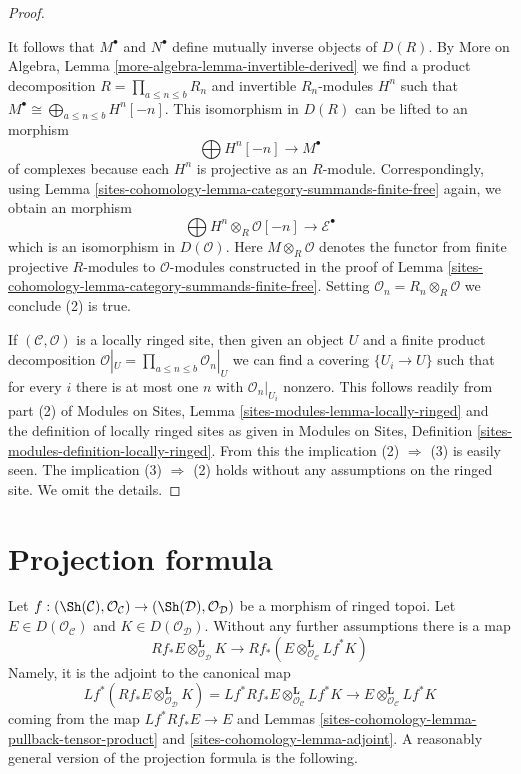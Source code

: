 \begin{proof}
\begin{enumerate}
\end{enumerate}
It follows that $M^\bullet$ and $N^\bullet$ define
mutually inverse objects of $D(R)$. By
More on Algebra, Lemma \ref{more-algebra-lemma-invertible-derived}
we find a product decomposition $R = \prod_{a \leq n \leq b} R_n$
and invertible $R_n$-modules $H^n$ such
that $M^\bullet \cong \bigoplus_{a \leq n \leq b} H^n[-n]$.
This isomorphism in $D(R)$ can be lifted to an morphism
$$
\bigoplus H^n[-n] \longrightarrow M^\bullet
$$
of complexes because each $H^n$ is projective as an $R$-module.
Correspondingly, using Lemma \ref{sites-cohomology-lemma-category-summands-finite-free} again,
we obtain an morphism
$$
\bigoplus H^n \otimes_R \mathcal{O}[-n] \to \mathcal{E}^\bullet
$$
which is an isomorphism in $D(\mathcal{O})$. Here $M \otimes_R \mathcal{O}$
denotes the functor from finite projective $R$-modules to $\mathcal{O}$-modules
constructed in the proof of Lemma \ref{sites-cohomology-lemma-category-summands-finite-free}.
Setting $\mathcal{O}_n = R_n \otimes_R \mathcal{O}$ we conclude
(2) is true.

\medskip\noindent
If $(\mathcal{C}, \mathcal{O})$ is a locally ringed site,
then given an object $U$ and a finite product decomposition
$\mathcal{O}|_U = \prod_{a \leq n \leq b} \mathcal{O}_n|_U$
we can find a covering $\{U_i \to U\}$ such that for every
$i$ there is at most one $n$ with $\mathcal{O}_n|_{U_i}$ nonzero.
This follows readily from part (2) of
Modules on Sites, Lemma \ref{sites-modules-lemma-locally-ringed}
and the definition of locally ringed sites as given in
Modules on Sites, Definition \ref{sites-modules-definition-locally-ringed}.
From this the implication (2) $\Rightarrow$ (3) is easily seen.
The implication (3) $\Rightarrow$ (2) holds without any assumptions
on the ringed site. We omit the details.
\end{proof}

\section{Projection formula}
\label{sites-cohomology-section-projection-formula}
Let $f : (\Sh(\mathcal{C}), \mathcal{O}_\mathcal{C}) \to
(\Sh(\mathcal{D}), \mathcal{O}_\mathcal{D})$ be a morphism of ringed topoi.
Let $E \in D(\mathcal{O}_\mathcal{C})$ and $K \in D(\mathcal{O}_\mathcal{D})$.
Without any further assumptions there is a map
\begin{equation}
\label{equation-projection-formula-map}
Rf_*E \otimes^\mathbf{L}_{\mathcal{O}_\mathcal{D}} K
\longrightarrow
Rf_*(E \otimes^\mathbf{L}_{\mathcal{O}_\mathcal{C}} Lf^*K)
\end{equation}
Namely, it is the adjoint to the canonical map
$$
Lf^*(Rf_*E \otimes^\mathbf{L}_{\mathcal{O}_\mathcal{D}} K) =
Lf^*Rf_*E \otimes^\mathbf{L}_{\mathcal{O}_\mathcal{C}} Lf^*K
\longrightarrow
E \otimes^\mathbf{L}_{\mathcal{O}_\mathcal{C}} Lf^*K
$$
coming from the map $Lf^*Rf_*E \to E$ and Lemmas
\ref{sites-cohomology-lemma-pullback-tensor-product} and \ref{sites-cohomology-lemma-adjoint}.
A reasonably general version of the projection formula is the following.

